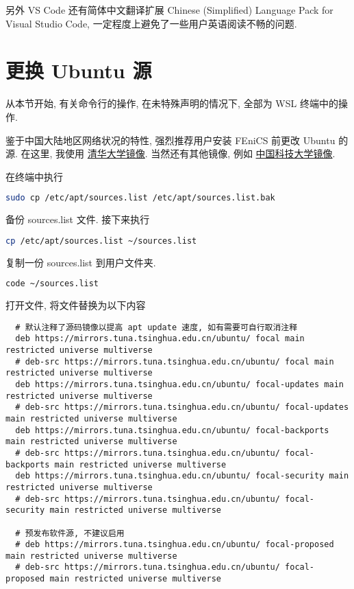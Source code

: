 \documentclass[fontset=founder]{ctexart}
\begin{document}
另外 VS Code 还有简体中文翻译扩展 \textsf{Chinese (Simplified) Language Pack for Visual Studio Code},
一定程度上避免了一些用户英语阅读不畅的问题.

\section{更换 Ubuntu 源}

从本节开始,
有关命令行的操作,
在未特殊声明的情况下,
全部为 WSL 终端中的操作.

鉴于中国大陆地区网络状况的特性,
强烈推荐用户安装 FEniCS 前更改 Ubuntu 的源.
在这里,
我使用%
\href{https://mirrors.tuna.tsinghua.edu.cn/help/ubuntu/}{清华大学镜像}.
当然还有其他镜像,
例如%
\href{https://mirrors.ustc.edu.cn/help/ubuntu.html}{中国科技大学镜像}.

在终端中执行
\begin{lstlisting}[language = bash]
  sudo cp /etc/apt/sources.list /etc/apt/sources.list.bak
\end{lstlisting}
备份 \textsf{sources.list} 文件.
接下来执行
\begin{lstlisting}[language = bash]
  cp /etc/apt/sources.list ~/sources.list
\end{lstlisting}
复制一份 \textsf{sources.list} 到用户文件夹.
\begin{lstlisting}[language = bash]
  code ~/sources.list
\end{lstlisting}
打开文件,
将文件替换为以下内容
\begin{lstlisting}
  # 默认注释了源码镜像以提高 apt update 速度, 如有需要可自行取消注释
  deb https://mirrors.tuna.tsinghua.edu.cn/ubuntu/ focal main restricted universe multiverse
  # deb-src https://mirrors.tuna.tsinghua.edu.cn/ubuntu/ focal main restricted universe multiverse
  deb https://mirrors.tuna.tsinghua.edu.cn/ubuntu/ focal-updates main restricted universe multiverse
  # deb-src https://mirrors.tuna.tsinghua.edu.cn/ubuntu/ focal-updates main restricted universe multiverse
  deb https://mirrors.tuna.tsinghua.edu.cn/ubuntu/ focal-backports main restricted universe multiverse
  # deb-src https://mirrors.tuna.tsinghua.edu.cn/ubuntu/ focal-backports main restricted universe multiverse
  deb https://mirrors.tuna.tsinghua.edu.cn/ubuntu/ focal-security main restricted universe multiverse
  # deb-src https://mirrors.tuna.tsinghua.edu.cn/ubuntu/ focal-security main restricted universe multiverse
  
  # 预发布软件源, 不建议启用
  # deb https://mirrors.tuna.tsinghua.edu.cn/ubuntu/ focal-proposed main restricted universe multiverse
  # deb-src https://mirrors.tuna.tsinghua.edu.cn/ubuntu/ focal-proposed main restricted universe multiverse
\end{lstlisting}
\end{document}
